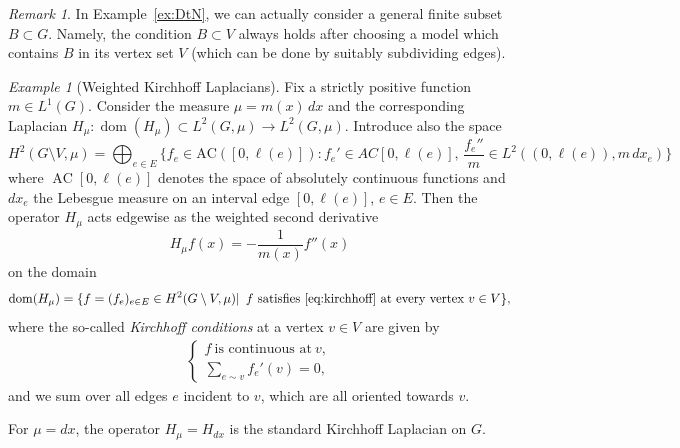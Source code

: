 \documentclass[reqno]{amsart}
\theoremstyle{plain}
\theoremstyle{definition}
\theoremstyle{remark}
\newtheorem{rmk}[thm]{Remark}
\newtheorem{ex}[thm]{Example}
\numberwithin{equation}{section}
\newcommand{\dom}{\operatorname{dom}}
\newcommand{\AC}{\operatorname{AC}}
\begin{document}
\begin{rmk} \label{rem:DtNGeneral}
In Example~\ref{ex:DtN}, we can actually consider a general finite subset $B \subset G$. Namely, the condition $B \subset V$ always holds after choosing a model which contains $B$ in its vertex set $V$ (which can be done by suitably subdividing edges).
\end{rmk}

\begin{ex}[Weighted Kirchhoff Laplacians]\label{ex:WeightedKirchhoffLaplacian}
Fix a strictly positive function $m  \in L^1(G)$. Consider the measure $\mu = m(x) \,dx$ and the corresponding Laplacian $H_\mu \colon \dom(H_\mu) \subset L^2(G, \mu) \to  L^2(G, \mu)$. Introduce also the space
\[
H^2(G\setminus V, \mu) =  \bigoplus_{e \in E} \Big \{f_e \in  \mathrm{AC}([0, \ell(e)]) \colon   f_e' \in AC[0, \ell(e)], \, \frac{f_e''}{m} \in L^2((0, \ell(e)), m \,dx_e) \Big \}
\] 
where $\AC[0, \ell(e)]$ denotes the space of absolutely continuous functions and $dx_e$ the Lebesgue measure on an interval edge $[0, \ell(e)]$, $e \in E$. Then the operator $H_\mu$ acts edgewise as the weighted second derivative
\[
H_\mu f (x) =  -   \frac{1}{m(x)} f''(x)
\]
on the domain
\[
\dom(H_\mu) = \{f =(f_e)_{e \in E} \in H^2(G \setminus V, \mu)| \, \text{ $f$ satisfies \eqref{eq:kirchhoff} at every vertex $v \in V$} \},
\]
where the so-called {\em Kirchhoff conditions} at a vertex $v  \in V$ are given by
\begin{align}\label{eq:kirchhoff}
\begin{cases} f\ \text{is continuous at}\ v,\\[1mm] 
\sum\limits_{e \sim v} f_e'(v) = 0, \end{cases}
\end{align}
and we sum over all edges $e$ incident to $v$, which are all oriented towards $v$.

For $\mu = d x$, the operator $H_\mu =H_{dx}$ is the standard Kirchhoff Laplacian on $G$.
\end{ex}
\end{document}
